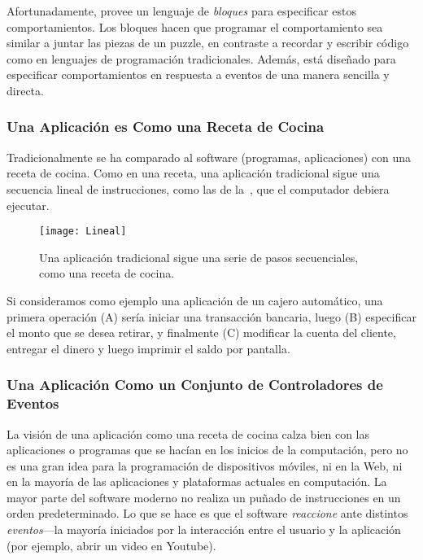 Afortunadamente, \AppInventor provee un lenguaje de \emph{bloques}
para especificar estos comportamientos. Los bloques hacen que
programar el comportamiento sea similar a juntar las piezas de un
puzzle, en contraste a recordar y escribir código como en lenguajes de
programación tradicionales. Además, \AppInventor está diseñado para
especificar comportamientos en respuesta a eventos de una manera
sencilla y directa.

\subsubsection*{Una Aplicación es Como una Receta de Cocina}

Tradicionalmente se ha comparado al software (programas, aplicaciones)
con una receta de cocina. Como en una receta, una aplicación
tradicional sigue una secuencia lineal de instrucciones, como las de
la~, que el computador debiera ejecutar.

\begin{figure}[H]
\centering
\texttt{[image: Lineal]}
\caption{Una aplicación tradicional sigue una serie de pasos
  secuenciales, como una receta de cocina.}
\label{fig:lineal}
\end{figure}

Si consideramos como ejemplo una aplicación de un cajero automático,
una primera operación (A) sería iniciar una transacción bancaria,
luego (B) especificar el monto que se desea retirar, y finalmente (C)
modificar la cuenta del cliente, entregar el dinero y luego imprimir
el saldo por pantalla.

\subsubsection*{Una Aplicación Como un Conjunto de Controladores de
  Eventos}

La visión de una aplicación como una receta de cocina calza bien con
las aplicaciones o programas que se hacían en los inicios de la
computación, pero no es una gran idea para la programación de
dispositivos móviles, ni en la Web, ni en la mayoría de las
aplicaciones y plataformas actuales en computación. La mayor parte del
software moderno no realiza un puñado de instrucciones en un orden
predeterminado. Lo que se hace es que el software \emph{reaccione}
ante distintos \emph{eventos}---la mayoría iniciados por la
interacción entre el usuario y la aplicación (por ejemplo, abrir un
video en Youtube).

